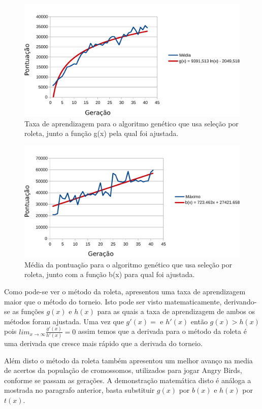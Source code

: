 \documentclass[10pt,a4paper]{article}
\begin{document}
\begin{figure}[H]
  \center
  \includegraphics[scale=0.6]{imgs/plotRoleta.pdf}            
  \caption{Taxa de aprendizagem para o algoritmo genético que usa seleção por roleta, junto a função g(x) pela
qual foi ajustada.}
  \label{fig:taxaAprendizagemRoleta}
\end{figure}
\begin{figure}[H]
  \center
  \includegraphics[scale=0.6]{imgs/plotRoleta2.pdf}
  \caption{Média da pontuação para o algoritmo genético que usa seleção por roleta, junto com a função b(x)
para qual foi ajustada.}
  \label{fig:mediaRoleta}
\end{figure}

Como pode-se ver o método da roleta, apresentou uma taxa de aprendizagem maior que o método do torneio. Isto pode ser visto matematicamente, derivando-se as funções $g(x)$ e $h(x)$  para as quais a taxa de aprendizagem de ambos os métodos foram ajustada. Uma vez que $g'(x)=$ e $h'(x)$ então $g(x)>h(x)$ pois $lim_{x \to \infty} \frac{g'(x)}{h'(x)}=0$ assim temos que a derivada para o método da roleta é uma derivada  que cresce mais rápido que a derivada do torneio.

Além disto o método da roleta também apresentou um melhor avanço na media de acertos da população de cromossomos, utilizados para jogar Angry Birds, conforme se passam as gerações. A demonstração matemática disto é análoga a mostrada no paragrafo anterior, basta substituir $g(x)$ por $b(x)$ e $h(x)$ por $t(x)$.
\end{document}
